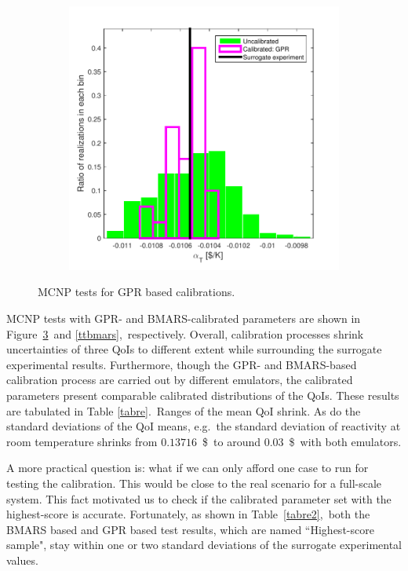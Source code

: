 \documentclass[review]{elsarticle}
\begin{document}
\begin{figure}[ht!]
\begin{subfigure}{0.5\textwidth}
\label{gptlam}
\end{subfigure}
~
\begin{subfigure}{0.5\textwidth}
\centering
\includegraphics[width=0.9\linewidth]{NSE15-48R1_Figure15c.pdf}
\label{gpalp}
\end{subfigure}
\caption{MCNP tests for GPR based calibrations.}
\label{ttgpr}
\end{figure}

{MCNP tests with GPR- and BMARS-calibrated parameters are shown in Figure\ \ref{ttgpr}\ and \ref{ttbmars},\ respectively. Overall, calibration processes shrink uncertainties of three QoIs to different extent while surrounding the surrogate experimental results. Furthermore, though the GPR- and BMARS-based calibration process are carried out by different emulators, the calibrated parameters present comparable calibrated distributions of the QoIs.} These results are tabulated in Table \ref{tabre}.~Ranges of the mean QoI shrink. As do the standard deviations of the QoI means, e.g.~the standard deviation of reactivity at room temperature shrinks from $0.13716$~\$\ to around $0.03$~\$\ with both emulators.

A more practical question is: what if we can only afford one case to run for testing the calibration. This would be close to the real scenario for  a full-scale system. This fact motivated us to check if the calibrated parameter set with the highest-score is accurate. Fortunately, as shown in Table~\ref{tabre2},~both the BMARS based and GPR based test results, which are named ``Highest-score sample", stay within one or two standard deviations of the surrogate experimental values.
\end{document}

